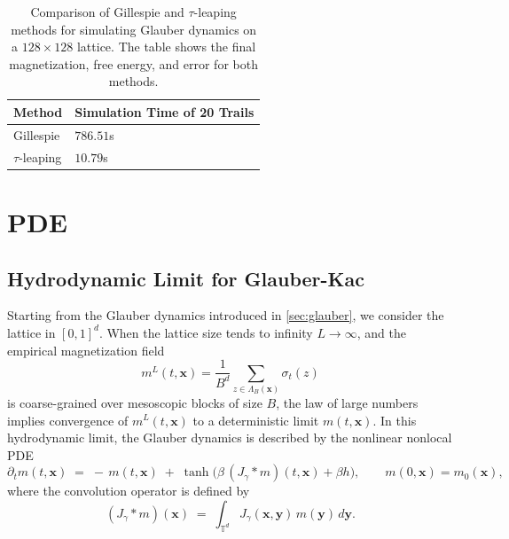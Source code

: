 \documentclass[11pt,a4paper]{article}
\begin{document}
\begin{table}
    \centering
    \begin{tabular}{ll}
        \hline
        \hline
        Method & Simulation Time of 20 Trails \\
        \hline
        Gillespie & $786.51$s \\
        $\tau$-leaping & $10.79$s \\
        \hline
        \hline
    \end{tabular}
    \caption{Comparison of Gillespie and $\tau$-leaping methods for simulating Glauber dynamics on a $128 \times 128$ lattice. The table shows the final magnetization, free energy, and error for both methods.}
    \label{tab:gillespie_vs_tau_leaping}
\end{table}

\section{PDE}

\subsection{Hydrodynamic Limit for Glauber-Kac}

Starting from the Glauber dynamics introduced in \cref{sec:glauber}, we consider the lattice in $[0,1]^d$. When the lattice size tends to infinity $L\to\infty$, and the empirical magnetization field
\begin{equation}
    m^L(t,\mathbf{x}) = \frac{1}{B^d}\sum_{z\in \Lambda_B(\mathbf{x})} \sigma_t(z)
\end{equation}
is coarse-grained over mesoscopic blocks of size $B$, the law of large numbers implies convergence of $m^L(t,\mathbf{x})$ to a deterministic limit $m(t,\mathbf{x})$. 
In this hydrodynamic limit, the Glauber dynamics is described by the nonlinear nonlocal PDE
\begin{equation}\label{eq:nonlocal}
    \partial_t m(t,\mathbf{x}) \;=\; -\,m(t,\mathbf{x})\;+\;\tanh\!\Big(\beta\, (J_\gamma * m)(t,\mathbf{x}) + \beta h\Big), 
    \qquad m(0,\mathbf{x})=m_0(\mathbf{x}),
\end{equation}
where the convolution operator is defined by
\begin{equation}
    \label{eq:convolution}
    (J_\gamma * m)(\mathbf{x}) \;=\; \int_{\mathbb{T}^d} J_\gamma(\mathbf{x},\mathbf{y})\,m(\mathbf{y})\,d\mathbf{y}.
\end{equation}
\end{document}
